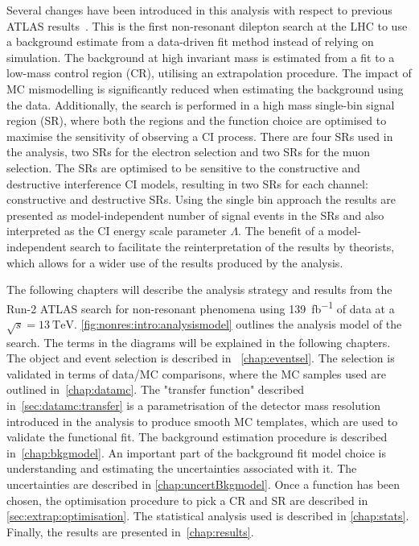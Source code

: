 Several changes have been introduced in this analysis with respect to previous ATLAS results~\cite{EXOT-2016-05}. This is the first non-resonant dilepton search at the LHC to use a background estimate from a data-driven fit method instead of relying on simulation. The background at high invariant mass is estimated from a fit to a low-mass control region (CR), utilising an extrapolation procedure. The impact of MC mismodelling is significantly reduced when estimating the background using the data. Additionally, the search is performed in a high mass single-bin signal region (SR), where both the regions and the function choice are optimised to maximise the sensitivity of observing a CI process. There are four SRs used in the analysis, two SRs for the electron selection and two SRs for the muon selection. The SRs are optimised to be sensitive to the constructive and destructive interference CI models, resulting in two SRs for each channel: constructive and destructive SRs. Using the single bin approach the results are presented as  model-independent number of signal events in the SRs and also interpreted as the CI energy scale parameter $\Lambda$. The benefit of a model-independent search to facilitate the reinterpretation of the results by theorists, which allows for a wider use of the results produced by the analysis. 

The following chapters will describe the analysis strategy and results from the Run-2 ATLAS search for non-resonant phenomena using \SI{139}{\femto\barn^{-1}} of data at a $\sqrt{s}=\SI{13}{\tera\electronvolt}$. \cref{fig:nonres:intro:analysismodel} outlines the analysis model of the search. The terms in the diagrams will be explained in the following chapters. The object and event selection is described in ~\cref{chap:eventsel}. The selection is validated in terms of data/MC comparisons, where the MC samples used are outlined in~\cref{chap:datamc}. The "transfer function" described in~\cref{sec:datamc:transfer} is a parametrisation of the detector mass resolution introduced in the analysis to produce smooth MC templates, which are used to validate the functional fit. The background estimation procedure is described in~\cref{chap:bkgmodel}. An important part of the background fit model choice is understanding and estimating the uncertainties associated with it. The uncertainties are described in \cref{chap:uncertBkgmodel}. Once a function has been chosen, the optimisation procedure to pick a CR and SR are described in \cref{sec:extrap:optimisation}. The statistical analysis used is described in \cref{chap:stats}. Finally, the results are presented in~\cref{chap:results}. 

